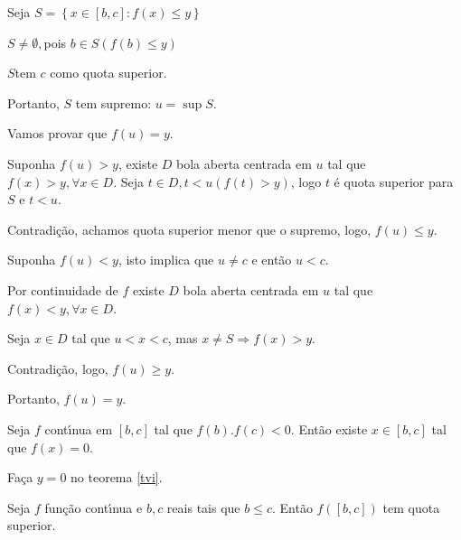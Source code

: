 \documentclass{book}
\begin{document}
\begin{dem}


Seja $S = \left\{ {x \in \left[ {b,c} \right]:f\left( x \right) \leqslant y}
\right\}$

$S \ne \emptyset ,$pois $b \in S\left( {f\left( b \right) \leqslant y}
\right)$

$S$tem $c$ como quota superior.

Portanto, $S$ tem supremo: $u = \sup S$.

Vamos provar que $f\left( u \right) = y$.

Suponha $f\left( u \right) > y$, existe $D$ bola aberta centrada em $u$ tal
que $f\left( x \right) > y,\forall x \in D$. Seja $t \in D,t < u\left(
{f\left( t \right) > y} \right)$, logo $t$ \'{e} quota superior para $S$ e
$t < u$.

Contradi\c c\~ao, achamos quota superior menor que o supremo, logo,
$f\left( u \right) \leqslant y$.

Suponha $f\left( u \right) < y$, isto implica que $u \ne c$ e ent\~ao $u <
c$.

Por continuidade de $f$ existe $D$ bola aberta centrada em $u$ tal que \\
$f\left( x \right) < y,\forall x \in D$.

Seja $x \in D$ tal que $u < x < c$, mas $x \ne S \Rightarrow f\left( x
\right) > y$.

Contradi\c c\~ao, logo, $f\left( u \right) \geqslant y$.

Portanto, $f\left( u \right) = y$.

\end{dem}

\begin{teo}

Seja $f$ cont\'{\i}nua em $\left[ {b,c} \right]$ tal que $f\left( b
\right).f\left( c \right) < 0$. Ent\~ao existe $x \in \left[ {b,c}
\right]$ tal que $f\left( x \right) = 0$.

\end{teo}

\begin{dem}

Fa\c ca $y=0$ no teorema \ref{tvi}.

\end{dem}

\begin{teo} \label{t1}

Seja $f$ fun\c c\~ao cont\'{\i}nua e $b,c$ reais tais que $b \leqslant
c$. Ent\~ao $f\left( {\left[ {b,c} \right]} \right)$ tem quota superior.

\end{teo}
\end{document}
